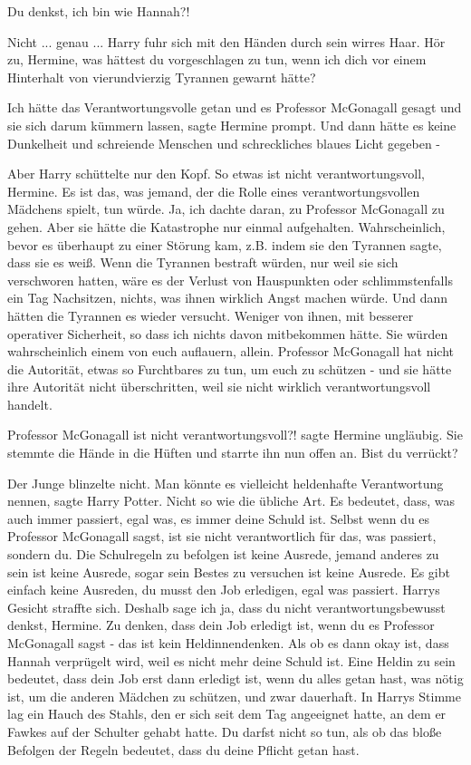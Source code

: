 \glqq{}Du denkst, ich bin wie Hannah?!\grqq{}

\glqq{}Nicht ... genau ...\grqq{} Harry fuhr sich mit den Händen durch sein
wirres Haar. \glqq{}Hör zu, Hermine, was hättest du vorgeschlagen zu tun, wenn
ich dich vor einem Hinterhalt von vierundvierzig Tyrannen gewarnt hätte?\grqq{}

\glqq{}Ich hätte das Verantwortungsvolle getan und es Professor McGonagall gesagt
und sie sich darum kümmern lassen\grqq{}, sagte Hermine prompt. \glqq{}Und dann
hätte es keine Dunkelheit und schreiende Menschen und schreckliches blaues Licht
gegeben -\grqq{}

Aber Harry schüttelte nur den Kopf. \glqq{}So etwas ist nicht verantwortungsvoll,
Hermine. Es ist das, was jemand, der die Rolle eines verantwortungsvollen
Mädchens spielt, tun würde. Ja, ich dachte daran, zu Professor McGonagall zu
gehen. Aber sie hätte die Katastrophe nur einmal aufgehalten. Wahrscheinlich,
bevor es überhaupt zu einer Störung kam, z.B. indem sie den Tyrannen sagte, dass
sie es weiß. Wenn die Tyrannen bestraft würden, nur weil sie sich verschworen
hatten, wäre es der Verlust von Hauspunkten oder schlimmstenfalls ein Tag
Nachsitzen, nichts, was ihnen wirklich Angst machen würde. Und dann hätten die
Tyrannen es wieder versucht. Weniger von ihnen, mit besserer operativer
Sicherheit, so dass ich nichts davon mitbekommen hätte. Sie würden
wahrscheinlich einem von euch auflauern, allein. Professor McGonagall hat nicht
die Autorität, etwas so Furchtbares zu tun, um euch zu schützen - und sie hätte
ihre Autorität nicht überschritten, weil sie nicht wirklich verantwortungsvoll
handelt.\grqq{}

\glqq{}Professor McGonagall ist nicht verantwortungsvoll?!\grqq{} sagte Hermine
ungläubig. Sie stemmte die Hände in die Hüften und starrte ihn nun offen an.
\glqq{}Bist du verrückt?\grqq{}

Der Junge blinzelte nicht. \glqq{}Man könnte es vielleicht heldenhafte
Verantwortung nennen\grqq{}, sagte Harry Potter. \glqq{}Nicht so wie die übliche
Art. Es bedeutet, dass, was auch immer passiert, egal was, es immer deine Schuld
ist. Selbst wenn du es Professor McGonagall sagst, ist sie nicht verantwortlich
für das, was passiert, sondern du. Die Schulregeln zu befolgen ist keine
Ausrede, jemand anderes zu sein ist keine Ausrede, sogar sein Bestes zu
versuchen ist keine Ausrede. Es gibt einfach keine Ausreden, du musst den Job
erledigen, egal was passiert.\grqq{} Harrys Gesicht straffte sich. \glqq{}Deshalb
sage ich ja, dass du nicht verantwortungsbewusst denkst, Hermine. Zu denken,
dass dein Job erledigt ist, wenn du es Professor McGonagall sagst - das ist kein
Heldinnendenken. Als ob es dann okay ist, dass Hannah verprügelt wird, weil es
nicht mehr deine Schuld ist. Eine Heldin zu sein bedeutet, dass dein Job erst
dann erledigt ist, wenn du alles getan hast, was nötig ist, um die anderen
Mädchen zu schützen, und zwar dauerhaft.\grqq{} In Harrys Stimme lag ein Hauch
des Stahls, den er sich seit dem Tag angeeignet hatte, an dem er Fawkes auf der
Schulter gehabt hatte. \glqq{}Du darfst nicht so tun, als ob das bloße Befolgen
der Regeln bedeutet, dass du deine Pflicht getan hast.\grqq{}

